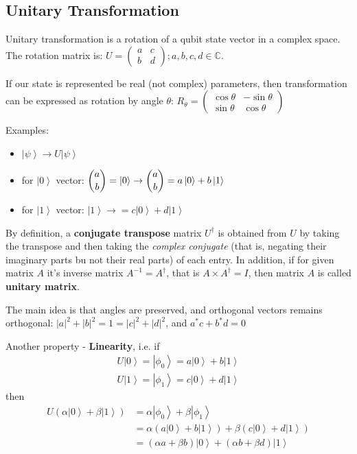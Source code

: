 \documentclass{scrartcl}
\newcommand{\cplx}{\mathbb{C}} %
\newcommand{\ket}[1]{\left| #1 \right>} %
\begin{document}
\subsection{Unitary Transformation}
\label{sec:5-3}

Unitary transformation is a rotation of a qubit state vector in a complex space.
The rotation matrix is: $U = \begin{pmatrix} a & c \\ b & d \end{pmatrix}; a, b,
c, d \in \cplx$.

If our state is represented be real (not complex) parameters, then
transformation can be expressed as rotation by angle $\theta$: $R_\theta =
\begin{pmatrix} \cos \theta & -\sin\theta \\ \sin\theta &
  \cos\theta \end{pmatrix}$

Examples:
\begin{itemize}
\item $\ket\psi \to U\ket\psi$
\item for $\ket0$ vector: $ \dbinom{a}{b} = \ket0 \to \dbinom ab = a\ket0 + b
  \ket1$
\item for $\ket1$ vector: $\ket1 \to = c\ket0 + d \ket1$
\end{itemize}

By definition, a {\bf conjugate transpose} matrix $U^\dag$ is obtained from $U$
by taking the transpose and then taking the {\it complex conjugate} (that is,
negating their imaginary parts bu not their real parts) of each entry. In
addition, if for given matrix $A$ it's inverse matrix $A^{-1} = A^\dag$, that is
$A \times A^\dag = I$, then matrix $A$ is called {\bf unitary matrix}.

The main idea is that angles are preserved, and orthogonal vectors remains
orthogonal: $|a|^2 + |b|^2 = 1 = |c|^2 + |d|^2$, and $a^*c + b^*d = 0$

Another property - {\bf Linearity}, i.e. if
\begin{gather*}
  U\ket0 = \ket{\phi_0} = a\ket0 + b \ket1 \\
  U\ket1 = \ket{\phi_1} = c\ket0 + d \ket1 \end{gather*} then
\[\begin{split}
  U(\alpha \ket0 + \beta \ket1) &= \alpha\ket{\phi_0} + \beta\ket{\phi_1} \\ &=
  \alpha (a\ket0 + b \ket1) + \beta (c\ket0 + d\ket1) \\ &= (\alpha a + \beta b)
  \ket0 + (\alpha b + \beta d) \ket1 \end{split}\]
\end{document}

